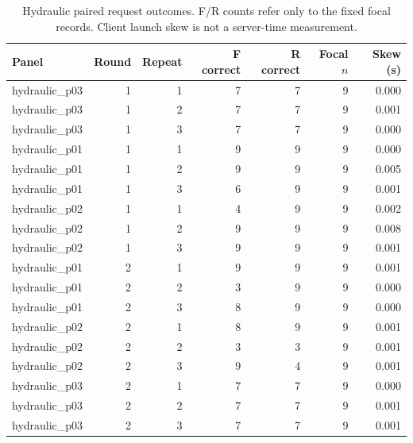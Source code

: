\documentclass[11pt,a4paper]{article}
\begin{document}
\begin{table}[htbp]\centering\small
\caption{Hydraulic paired request outcomes. F/R counts refer only to the fixed focal records. Client launch skew is not a server-time measurement.}
\label{tab:policy_pairs_hydraulic}
\begin{tabular}{@{}lrrrrrr@{}}\toprule
Panel & Round & Repeat & F correct & R correct & Focal $n$ & Skew (s) \\\midrule
hydraulic\_p03 & 1 & 1 & 7 & 7 & 9 & 0.000 \\
hydraulic\_p03 & 1 & 2 & 7 & 7 & 9 & 0.001 \\
hydraulic\_p03 & 1 & 3 & 7 & 7 & 9 & 0.000 \\
hydraulic\_p01 & 1 & 1 & 9 & 9 & 9 & 0.000 \\
hydraulic\_p01 & 1 & 2 & 9 & 9 & 9 & 0.005 \\
hydraulic\_p01 & 1 & 3 & 6 & 9 & 9 & 0.001 \\
hydraulic\_p02 & 1 & 1 & 4 & 9 & 9 & 0.002 \\
hydraulic\_p02 & 1 & 2 & 9 & 9 & 9 & 0.008 \\
hydraulic\_p02 & 1 & 3 & 9 & 9 & 9 & 0.001 \\
hydraulic\_p01 & 2 & 1 & 9 & 9 & 9 & 0.001 \\
hydraulic\_p01 & 2 & 2 & 3 & 9 & 9 & 0.000 \\
hydraulic\_p01 & 2 & 3 & 8 & 9 & 9 & 0.000 \\
hydraulic\_p02 & 2 & 1 & 8 & 9 & 9 & 0.001 \\
hydraulic\_p02 & 2 & 2 & 3 & 3 & 9 & 0.001 \\
hydraulic\_p02 & 2 & 3 & 9 & 4 & 9 & 0.001 \\
hydraulic\_p03 & 2 & 1 & 7 & 7 & 9 & 0.000 \\
hydraulic\_p03 & 2 & 2 & 7 & 7 & 9 & 0.001 \\
hydraulic\_p03 & 2 & 3 & 7 & 7 & 9 & 0.001 \\
\bottomrule\end{tabular}\end{table}
\end{document}
